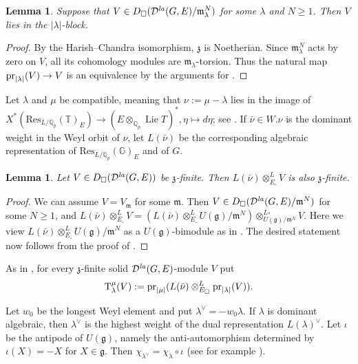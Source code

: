 \documentclass[a4paper,10pt]{amsart}
\theoremstyle{remark}
\theoremstyle{definition}
\theoremstyle{plain}
\newtheorem{lemma}[theorem]{Lemma}
\numberwithin{equation}{section}
\newcommand{\bbG}{{\mathbb G}}
\newcommand{\bbQ}{{\mathbb Q}}
\newcommand{\bbT}{{\mathbb T}}
\newcommand{\frg}{{\mathfrak g}}
\renewcommand{\frm}{{\mathfrak m}}
\newcommand{\frz}{{\mathfrak z}}
\newcommand{\calD}{{\mathcal D}}
\newcommand{\la}{{\it la}}
\newcommand{\pr}{{\rm pr}}
\DeclareMathOperator{\Lie}{{Lie}}
\begin{document}
\begin{lemma}\label{lem:infinitesimal-character-block}
Suppose that $V\in D_{\square}(\calD^{\la}(G,E)/\frm_{\lambda}^{N})$ for some $\lambda$ and $N\geq 1$. Then $V$ lies in the $|\lambda|$-block.
\end{lemma}

\begin{proof}
By the Harish--Chandra isomorphism, $\frz$ is Noetherian. Since $\mathfrak{m}_\lambda^N$ acts by zero on $V$, all its cohomology modules are $\mathfrak{m}_\lambda$-torsion. Thus the natural map $\pr_{|\lambda|}(V)\to V$ is an equivalence by the arguments for \cite[\href{https://stacks.math.columbia.edu/tag/0954}{Tag 0954} \& \href{https://stacks.math.columbia.edu/tag/0955}{Tag 0955}]{stacks-project}.
\end{proof}

Let $\lambda$ and $\mu$ be compatible, meaning that $\nu:=\mu-\lambda$ lies in the image of $X^*(\mathrm{Res}_{L/\bbQ_p}(\bbT)_E)\to(E\otimes_{\bbQ_p}\Lie T)^*, \eta\mapsto d\eta$; see \cite[Defs.~2.4.2 \& 2.4.3]{jena2021translation}.  If $\bar\nu\in W.\nu$ is the dominant weight in the Weyl orbit of $\nu$, let $L(\bar\nu)$ be the corresponding algebraic representation of $\mathrm{Res}_{L/\bbQ_p}(\bbG)_E$ and of $G$.  
\begin{lemma}
	Let $V\in D_{\square}(\calD^{\la}(G,E))$ be $\frz$-finite. Then $L(\bar\nu)\otimes_{E_{\square}}^{L}V$ is also $\frz$-finite.
\end{lemma}
\begin{proof}
	We can assume $V=V_{\frm}$ for some $\frm$. Then $V\in D_{\square}(\calD^{\la}(G,E)/\frm^N)$ for some $N\geq 1$, and $L(\bar\nu)\otimes_{E_{\square}}^{L}V=(L(\bar\nu)\otimes_{E_{\square}}^{L}U(\frg)/\frm^N)\otimes^{L\square}_{U(\frg)/\frm^N}V$. Here we view $L(\bar\nu)\otimes_{E_{\square}}^{L}U(\frg)/\frm^N$ as a $U(\frg)$-bimodule as in \cite[\S~2.2]{bernstein1980tensor}. The desired statement now follows from the proof of \cite[Cor.~2.6]{bernstein1980tensor}.
\end{proof}
As in \cite[Def.~2.4.5]{jena2021translation}, for every $\frz$-finite solid $\calD^{\la}(G,E)$-module $V$ put
\[
 \mathrm T_\lambda^\mu(V):=
 \pr_{|\mu|}(
 L(\bar\nu)\otimes^L_{E_\square}\pr_{|\lambda|}(V)).
\]

Let $w_0$ be the longest Weyl element and put $\lambda^\vee=-w_0\lambda$.  If $\lambda$ is dominant algebraic, then $\lambda^\vee$ is the highest weight of the dual representation $L(\lambda)^\vee$.  Let $\iota$ be the antipode of $U(\mathfrak g)$, namely the anti-automorphism determined by $\iota(X)=-X$ for $X\in\mathfrak g$.  Then $\chi_{\lambda^\vee}=\chi_\lambda\circ\iota$ (see for example \cite[Prop.~7.4.9]{Dixmier1977enveloping}).
\end{document}

